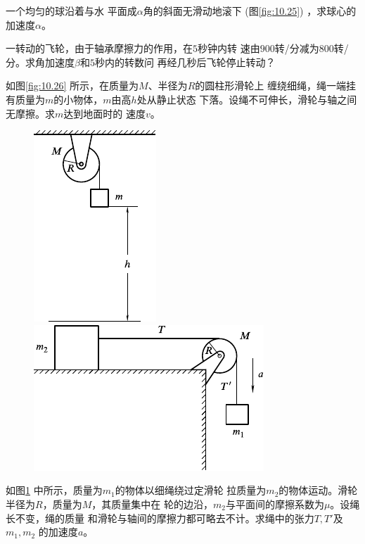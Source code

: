 \begin{exercises}
\exercise 一个均匀的球沿着与水
平面成$ \alpha $角的斜面无滑动地滚下
(图\ref{fig:10.25}) ，求球心的加速度$ \alpha $。

\exercise 一转动的飞轮，由于轴承摩擦力的作用，在$ 5 $秒钟内转
速由$ 900 $转/分减为$ 800 $转/分。求角加速度$ \beta $和$ 5 $秒内的转数问
再经几秒后飞轮停止转动？

\exercise 如图\ref{fig:10.26} 所示，在质量为$ M $、半径为$ R $的圆柱形滑轮上
缠绕细绳，绳一端挂有质量为$ m $的小物体，$ m $由高$ h $处从静止状态
下落。设绳不可伸长，滑轮与轴之间无摩擦。求$ m $达到地面时的
速度$ v $。
\begin{figure}[h]
  \begin{minipage}[b]{0.4\linewidth}
    \centering
    \includegraphics{figure/fig10.26}
    \caption{}
    \label{fig:10.26}
  \end{minipage}
  \begin{minipage}[b]{0.4\linewidth}
    \centering
    \includegraphics{figure/fig10.27}
    \caption{}
    \label{fig:10.27}
  \end{minipage}
\end{figure}

\exercise 如图\ref{fig:10.27} 中所示，质量为$ m _ { 1 } $的物体以细绳绕过定滑轮
拉质量为$ m _ { 2 } $的物体运动。滑轮半径为$ R $，质量为$ M $，其质量集中在
轮的边沿，$ m_2 $与平面间的摩擦系数为$ \mu $。设绳长不变，绳的质量
和滑轮与轴间的摩擦力都可略去不计。求绳中的张力$ T, T' $及$ m_1, m_2 $
的加速度$ a $。


\end{exercises}
